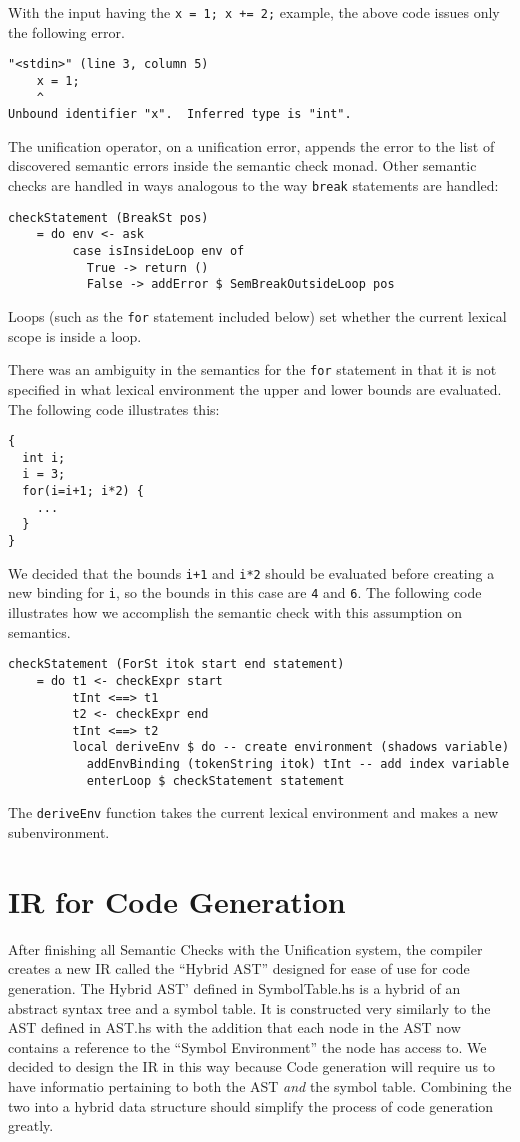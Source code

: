 \documentclass[11pt]{article}
\begin{document}
With the input having the \texttt{x = 1; x += 2;} example, the above
code issues only the following error.
\begin{verbatim}
"<stdin>" (line 3, column 5)
    x = 1;
    ^
Unbound identifier "x".  Inferred type is "int".
\end{verbatim}

The unification operator, on a unification error, appends the error to
the list of discovered semantic errors inside the semantic check
monad.  Other semantic checks are handled in ways analogous to the way
\texttt{break} statements are handled:
\begin{verbatim}
checkStatement (BreakSt pos)
    = do env <- ask
         case isInsideLoop env of
           True -> return ()
           False -> addError $ SemBreakOutsideLoop pos
\end{verbatim}%
Loops (such as the \texttt{for} statement included below) set whether
the current lexical scope is inside a loop.

There was an ambiguity in the semantics for the \texttt{for} statement
in that it is not specified in what lexical environment the upper and
lower bounds are evaluated.  The following code illustrates this:
\begin{verbatim}
{
  int i;
  i = 3;
  for(i=i+1; i*2) {
    ...
  }
}
\end{verbatim}

We decided that the bounds \texttt{i+1} and \texttt{i*2} should be
evaluated before creating a new binding for \texttt{i}, so the bounds
in this case are \texttt{4} and \texttt{6}.  The following code
illustrates how we accomplish the semantic check with this assumption
on semantics.
\begin{verbatim}
checkStatement (ForSt itok start end statement)
    = do t1 <- checkExpr start
         tInt <==> t1
         t2 <- checkExpr end
         tInt <==> t2
         local deriveEnv $ do -- create environment (shadows variable)
           addEnvBinding (tokenString itok) tInt -- add index variable
           enterLoop $ checkStatement statement
\end{verbatim}
The \texttt{deriveEnv} function takes the current lexical environment
and makes a new subenvironment.

\section{IR for Code Generation}
\label{sec:ir}

After finishing all Semantic Checks with the Unification system, the compiler creates a new IR called the ``Hybrid AST'' designed for ease of use for code generation. The Hybrid AST' defined in SymbolTable.hs is a hybrid of an abstract syntax tree and a symbol table. It is constructed very similarly to the AST defined in AST.hs with the addition that each node in the AST now contains a reference to the ``Symbol Environment''  the node has access to. We decided to design the IR in this way because Code generation will require us to have informatio pertaining to both the AST \emph{and} the symbol table. Combining the two into a hybrid data structure should simplify the process of code generation greatly.
\end{document}
